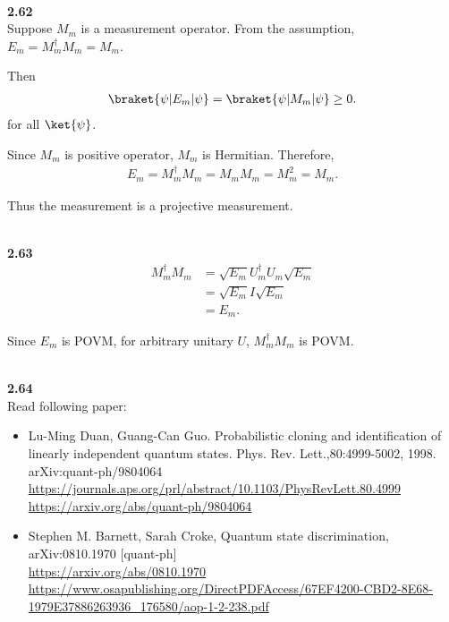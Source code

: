 \documentclass[10pt]{book}
\newcommand{\Textbf}[1]{\hspace{3mm}\\ \textbf{#1}\\}
\begin{document}
	
	
	\Textbf{2.62}
	
	Suppose $M_m$ is a measurement operator.
	From the assumption, $E_m = M_m^\dagger M_m = M_m$.
	
	Then
	\begin{equation}
\begin{aligned}
		\braket{\psi | E_m | \psi} = \braket{\psi | M_m | \psi} \geq 0.
	\end{aligned}
\end{equation}
	for all $\ket{\psi}$.
	
	Since $M_m$ is positive operator, $M_m$ is Hermitian.
	Therefore,
	\begin{equation}
\begin{aligned}
		E_m = M_m^\dagger M_m = M_m M_m = M_m^2 = M_m.
	\end{aligned}
\end{equation}
	
	Thus the measurement is a projective measurement.
	
	
	
	\Textbf{2.63}
	\begin{equation}
\begin{aligned}
		M_m^\dagger M_m &= \sqrt{E_m} U_m^\dagger U_m \sqrt{E_m}\\
		&= \sqrt{E_m} I \sqrt{E_m}\\
		&= E_m.
	\end{aligned}
\end{equation}
	
	Since $E_m$ is POVM,  for arbitrary  unitary $U$, $M_m^\dagger M_m$ is POVM.
	
	
	
	\Textbf{2.64}
	Read following paper:
	\begin{itemize}
		\item Lu-Ming Duan, Guang-Can Guo.  Probabilistic cloning and identification of linearly independent quantum states. Phys. Rev. Lett.,80:4999-5002, 1998. arXiv:quant-ph/9804064\\
		\url{https://journals.aps.org/prl/abstract/10.1103/PhysRevLett.80.4999}\\
		\url{https://arxiv.org/abs/quant-ph/9804064}
		\item Stephen M. Barnett, Sarah Croke, Quantum state discrimination, arXiv:0810.1970 [quant-ph]\\
		\url{https://arxiv.org/abs/0810.1970}\\
		\url{https://www.osapublishing.org/DirectPDFAccess/67EF4200-CBD2-8E68-1979E37886263936_176580/aop-1-2-238.pdf}
	\end{itemize}
	
\end{document}
